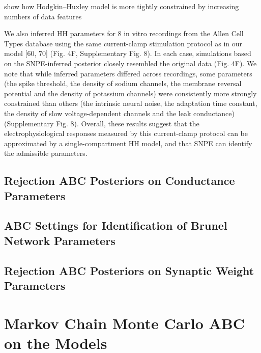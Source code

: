show how Hodgkin–Huxley model is more tightly constrained by increasing numbers of data features

We also inferred HH parameters for 8 in vitro recordings from the Allen Cell Types database using the same current-clamp stimulation protocol as in our model [60, 70] (Fig. 4F, Supplementary Fig. 8). In each case, simulations based on the SNPE-inferred posterior closely resembled the original data (Fig. 4F). We note that while inferred parameters differed across recordings, some parameters (the spike threshold, the density of sodium channels, the membrane reversal potential and the density of potassium channels) were consistently more strongly constrained than others (the intrinsic neural noise, the adaptation time constant, the density of slow voltage-dependent channels and the leak conductance) (Supplementary Fig. 8). Overall, these results suggest that the electrophysiological responses measured by this current-clamp protocol can be approximated by a single-compartment HH model, and that SNPE can identify the admissible parameters.

\section{Rejection ABC Posteriors on Conductance Parameters}

\section{ABC Settings for Identification of Brunel Network Parameters}

\section{Rejection ABC Posteriors on Synaptic Weight Parameters}

\chapter{Markov Chain Monte Carlo ABC on the Models}
